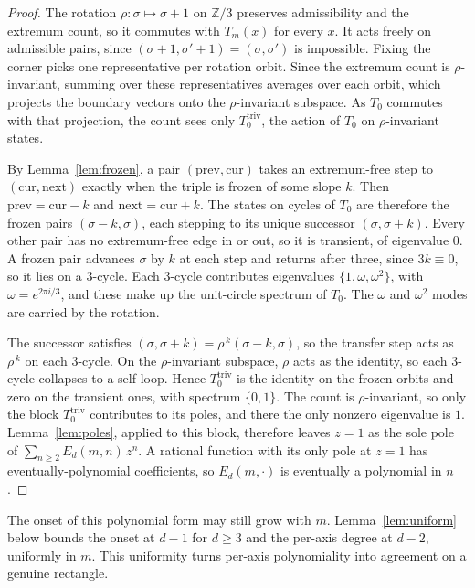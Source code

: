 \documentclass[11pt]{article}
\theoremstyle{definition}
\theoremstyle{remark}
\newcommand{\Z}{\mathbb{Z}}
\begin{document}
\begin{proof}
The rotation $\rho:\sigma\mapsto\sigma+1$ on $\Z/3$ preserves admissibility and the
extremum count, so it commutes with $T_m(x)$ for every $x$. It acts freely on
admissible pairs, since $(\sigma+1,\sigma'+1)=(\sigma,\sigma')$ is impossible. Fixing
the corner picks one representative per rotation orbit. Since the extremum count is
$\rho$-invariant, summing over these representatives averages over each orbit,
which projects the boundary vectors onto the $\rho$-invariant subspace. As $T_0$
commutes with that projection, the count sees only $T_0^{\mathrm{triv}}$, the action
of $T_0$ on $\rho$-invariant states.

\medskip\noindent
By Lemma~\ref{lem:frozen}, a pair $(\mathrm{prev},\mathrm{cur})$ takes an
extremum-free step to $(\mathrm{cur},\mathrm{next})$ exactly when the triple is
frozen of some slope $k$. Then $\mathrm{prev}=\mathrm{cur}-k$ and
$\mathrm{next}=\mathrm{cur}+k$. The states on cycles of $T_0$ are therefore the
frozen pairs $(\sigma-k,\sigma)$, each stepping to its unique successor
$(\sigma,\sigma+k)$. Every other pair has no extremum-free edge in or out, so it is
transient, of eigenvalue $0$. A frozen pair advances $\sigma$ by $k$ at each step
and returns after three, since $3k\equiv0$, so it lies on a $3$-cycle. Each
$3$-cycle contributes eigenvalues $\{1,\omega,\omega^2\}$, with
$\omega=e^{2\pi i/3}$, and these make up the unit-circle spectrum of $T_0$. The
$\omega$ and $\omega^2$ modes are carried by the rotation.

\medskip\noindent
The successor satisfies $(\sigma,\sigma+k)=\rho^{\,k}(\sigma-k,\sigma)$, so the
transfer step acts as $\rho^{\,k}$ on each $3$-cycle. On the $\rho$-invariant
subspace, $\rho$ acts as the identity, so each $3$-cycle collapses to a self-loop. Hence
$T_0^{\mathrm{triv}}$ is the identity on the frozen orbits and zero on the
transient ones, with spectrum $\{0,1\}$. The count is $\rho$-invariant, so only the
block $T_0^{\mathrm{triv}}$ contributes to its poles, and there the only nonzero
eigenvalue is $1$. Lemma~\ref{lem:poles}, applied to this block, therefore leaves
$z=1$ as the sole pole of $\sum_{n\ge2} E_d(m,n)\,z^n$. A rational function with its only pole at $z=1$ has
eventually-polynomial coefficients, so $E_d(m,\cdot)$ is eventually a polynomial in
$n$.
\end{proof}

The onset of this polynomial form may still grow with $m$. Lemma~\ref{lem:uniform}
below bounds the onset at $d-1$ for $d\ge3$ and the per-axis degree at $d-2$,
uniformly in $m$. This uniformity turns per-axis polynomiality into agreement on a
genuine rectangle.
\end{document}
